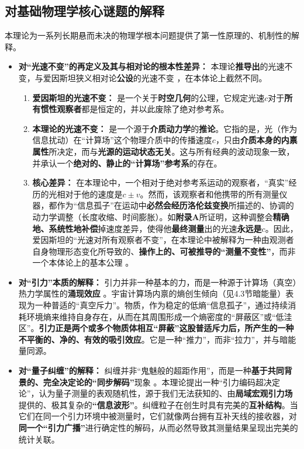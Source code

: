 \documentclass[11pt, a4paper]{article}
\begin{document}
\subsection{对基础物理学核心谜题的解释}

本理论为一系列长期悬而未决的物理学根本问题提供了第一性原理的、机制性的解释。

\begin{itemize}
    \item \textbf{对“光速不变”的再定义及其与相对论的根本性差异：}
    本理论\textbf{推导出}的光速不变，与爱因斯坦狭义相对论\textbf{公设}的光速不变 \cite{Einstein1905}，在本体论上截然不同。
    \begin{enumerate}
        \item \textbf{爱因斯坦的光速不变：} 是一个关于\textbf{时空几何}的公理，它规定光速$c$对于\textbf{所有惯性观察者}都是恒定的，并以此废除了绝对参考系。
        \item \textbf{本理论的光速不变：} 是一个源于\textbf{介质动力学}的\textbf{推论}。它指的是，光（作为信息扰动）在“计算场”这个物理介质中的传播速度$c$，只由\textbf{介质本身的内禀属性}所决定，而与\textbf{光源的运动状态无关}。这与所有经典的波动现象一致，并承认一个\textbf{绝对的、静止的“计算场”参考系}的存在。
        \item \textbf{核心差异：} 在本理论中，一个相对于绝对参考系运动的观察者，“真实”经历的光相对于他的速度是$c \pm v$。然而，该观察者和他携带的所有测量仪器，都作为“信息孤子”在运动中\textbf{必然会经历洛伦兹变换}所描述的、协调的动力学调整（长度收缩、时间膨胀）。如\textbf{附录A}所证明，这种调整会\textbf{精确地、系统性地补偿}掉速度差异，使得他\textbf{最终测量}出的光速\textbf{永远是$c$}。因此，爱因斯坦的“光速对所有观察者不变”，在本理论中被解释为一种由观测者自身物理形态变化所导致的、\textbf{操作上的、可被推导的“测量不变性”}，而非一个本体论上的基本公理 \cite{Einstein1905}。
    \end{enumerate}

    \item \textbf{对“引力”本质的解释：}
    引力并非一种基本的力，而是一种源于计算场（真空）热力学属性的\textbf{涌现效应} \cite{Newton1687}。宇宙计算场内禀的熵创生倾向（见4.3节暗能量）表现为一种普适的“真空斥力”。物质，作为稳定的低熵“信息孤子”，通过持续消耗环境熵来维持自身存在，从而在其周围形成一个熵密度的“屏蔽区”或“低洼区”。\textbf{引力正是两个或多个物质体相互“屏蔽”这股普适斥力后，所产生的一种不平衡的、净的、有效的吸引效应}。它是一种“推力”，而非“拉力”，并与暗能量同源。

    \item \textbf{对“量子纠缠”的解释：}
    纠缠并非“鬼魅般的超距作用”，而是一种\textbf{基于共同背景的、完全决定论的“同步解码”}现象 \cite{Bell1964}。本理论提出一种“引力编码超决定论”，认为量子测量的表观随机性，源于我们无法获知的、由\textbf{局域宏观引力场}提供的、极其复杂的\textbf{“信息波形”}。纠缠粒子在创生时具有完美的\textbf{互补结构}。当它们在同一个引力环境中被测量时，它们就像两台拥有互补天线的接收器，对\textbf{同一个“引力广播”}进行确定性的解码，从而必然导致其测量结果呈现出完美的统计关联。


\end{itemize}
\end{document}

